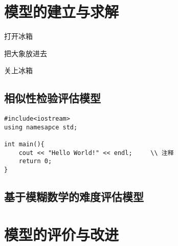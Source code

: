 \section{模型的建立与求解}

\begin{mgAlgorithm}
    \item 打开冰箱
    \item 把大象放进去
    \item 关上冰箱
\end{mgAlgorithm}

\subsection{相似性检验评估模型}



\begin{mgCodeBlock}
\end{mgCodeBlock}

\begin{mgCodeBlock}
\begin{verbatim}
#include<iostream>
using namesapce std;

int main(){
    cout << "Hello World!" << endl;     \\ 注释
    return 0;
}
\end{verbatim}
\end{mgCodeBlock}

\subsection{基于模糊数学的难度评估模型}

\subsection{}

\section{模型的评价与改进}
